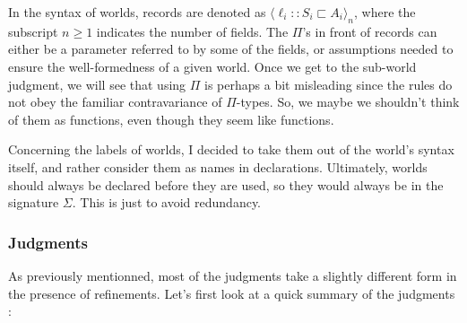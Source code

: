 \documentclass[letterpaper, 11pt]{article}
\begin{document}
    In the syntax of worlds, records are denoted as $\langle \ell_i {::} S_i \sqsubset A_i \rangle_n$, where the subscript $n \geq 1$ indicates the 
    number of fields.  The $\Pi$'s in front of records can either be a parameter referred to by some of the fields, or assumptions needed to ensure
    the well-formedness of a given world.  Once we get to the sub-world judgment, we will see that using $\Pi$ is perhaps a bit misleading since the
    rules do not obey the familiar contravariance of $\Pi$-types.  So, we maybe we shouldn't think of them as functions, even though they seem like functions.

    Concerning the labels of worlds, I decided to take them out of the world's syntax itself, and rather consider them as names in declarations.  
    Ultimately, worlds should always be declared before they are used, so they would always be in the signature $\Sigma$.  This is just to avoid redundancy.

    \subsubsection{Judgments}
    As previously mentionned, most of the judgments take a slightly different form in the presence of refinements.  Let's first look at a 
    quick summary of the judgments :
\end{document}
